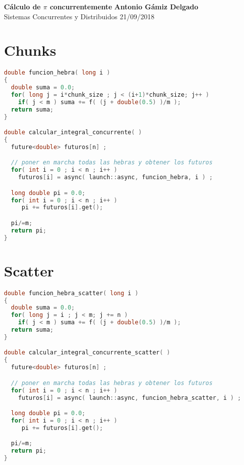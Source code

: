 \documentclass[a4paper, 11pt]{article}
\begin{document}
\noindent
\large\textbf{Cálculo de $\pi$ concurrentemente} \hfill \textbf{Antonio Gámiz Delgado} \\
\normalsize Sistemas Concurrentes y Distribuidos \hfill 21/09/2018

\section*{Chunks}

\begin{lstlisting}[language=C++, caption=Load repartida de forma contigua]
double funcion_hebra( long i )
{
  double suma = 0.0;
  for( long j = i*chunk_size ; j < (i+1)*chunk_size; j++ )
    if( j < m ) suma += f( (j + double(0.5) )/m );
  return suma;
}

double calcular_integral_concurrente( )
{
  future<double> futuros[n] ;

  // poner en marcha todas las hebras y obtener los futuros
  for( int i = 0 ; i < n ; i++ )
    futuros[i] = async( launch::async, funcion_hebra, i ) ;

  long double pi = 0.0;
  for( int i = 0 ; i < n ; i++ )
     pi += futuros[i].get();

  pi/=m;
  return pi;
}
\end{lstlisting}


\section*{Scatter}

\begin{lstlisting}[language=C++, caption=Load repartida de forma entrelazada]
double funcion_hebra_scatter( long i )
{
  double suma = 0.0;
  for( long j = i ; j < m; j += n )
    if( j < m ) suma += f( (j + double(0.5) )/m );
  return suma;
}

double calcular_integral_concurrente_scatter( )
{
  future<double> futuros[n] ;

  // poner en marcha todas las hebras y obtener los futuros
  for( int i = 0 ; i < n ; i++ )
    futuros[i] = async( launch::async, funcion_hebra_scatter, i ) ;

  long double pi = 0.0;
  for( int i = 0 ; i < n ; i++ )
     pi += futuros[i].get();

  pi/=m;
  return pi;
}
\end{lstlisting}
\end{document}
